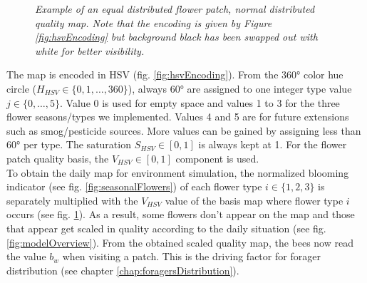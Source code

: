 	\begin{figure}[h]
		\centering
		\caption{\textit{Example of an equal distributed flower patch, normal distributed quality map. Note that the encoding is given by Figure \ref{fig:hsvEncoding} but background black has been swapped out with white for better visibility.}}
		\label{fig:normeqMap}
	\end{figure}
	
	The map is encoded in HSV (fig. \ref{fig:hsvEncoding}). From the 360° color hue circle ($H_{HSV} \in \{0,1,\ldots,360\}$), always 60° are assigned to one integer type value $j \in \{0,\ldots,5\}$. Value 0 is used for empty space and values 1 to 3 for the three flower seasons/types we implemented. Values 4 and 5 are for future extensions such as smog/pesticide sources. More values can be gained by assigning less than 60° per type. The saturation $S_{HSV} \in [0,1]$ is always kept at 1. For the flower patch quality basis, the $V_{HSV} \in [0,1]$ component is used.\\
	
	To obtain the daily map for environment simulation, the normalized blooming indicator (see fig. \ref{fig:seasonalFlowers}) of each flower type $i \in \{1,2,3\}$ is separately multiplied with the $V_{HSV}$ value of the basis map where flower type $i$ occurs (see fig. \ref{fig:normeqMap}). As a result, some flowers don't appear on the map and those that appear get scaled in quality according to the daily situation (see fig. \ref{fig:modelOverview}). From the obtained scaled quality map, the bees now read the value $b_w$ when visiting a patch. This is the driving factor for forager distribution (see chapter \ref{chap:foragersDistribution}).
	
